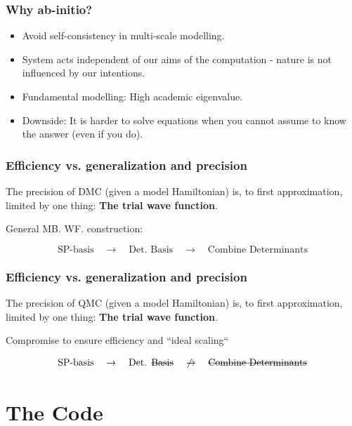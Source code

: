 \documentclass{beamer}
\begin{document}
\begin{frame}\frametitle{Why ab-initio?}

\begin{itemize}
 \item Avoid self-consistency in multi-scale modelling.
 \pause\item System acts independent of our aims of the computation - nature is not influenced by our intentions.
 \pause\item Fundamental modelling: High academic eigenvalue.
 \pause\item Downside: It is harder to solve equations when you cannot assume to know the answer (even if you do).
\end{itemize}

\end{frame}

\begin{frame}\frametitle{Efficiency vs. generalization and precision}

The precision of DMC (given a model Hamiltonian) is, to first approximation, limited by one thing: \textbf{The trial wave function}.

\pause
\vspace{0.5cm}
General MB. WF. construction:

\begin{equation*}
 \text{SP-basis} \quad \to \quad \text{Det. Basis} \quad \to \quad \text{Combine Determinants}
\end{equation*}


\end{frame}

\begin{frame}\frametitle{Efficiency vs. generalization and precision}

The precision of QMC (given a model Hamiltonian) is, to first approximation, limited by one thing: \textbf{The trial wave function}.


\vspace{0.5cm}
Compromise to ensure efficiency and ``ideal scaling``

\begin{equation*}
 \text{SP-basis} \quad \to \quad \text{Det. } \text{\sout{Basis}} \quad \not\to \quad \text{\sout{Combine Determinants}}
\end{equation*}


\end{frame}

\section{The Code}
\end{document}
